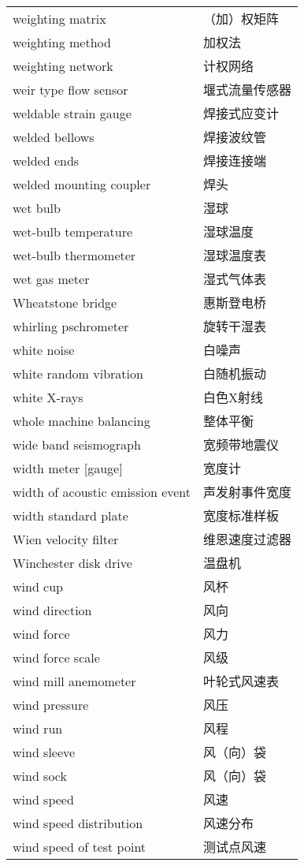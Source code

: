 \documentclass[
]{article}
\begin{document}
\begin{longtable}[]{@{}ll@{}}
weighting matrix & （加）权矩阵 \\
weighting method & 加权法 \\
weighting network & 计权网络 \\
weir type flow sensor & 堰式流量传感器 \\
weldable strain gauge & 焊接式应变计 \\
welded bellows & 焊接波纹管 \\
welded ends & 焊接连接端 \\
welded mounting coupler & 焊头 \\
wet bulb & 湿球 \\
wet-bulb temperature & 湿球温度 \\
wet-bulb thermometer & 湿球温度表 \\
wet gas meter & 湿式气体表 \\
Wheatstone bridge & 惠斯登电桥 \\
whirling pschrometer & 旋转干湿表 \\
white noise & 白噪声 \\
white random vibration & 白随机振动 \\
white X-rays & 白色X射线 \\
whole machine balancing & 整体平衡 \\
wide band seismograph & 宽频带地震仪 \\
width meter {[}gauge{]} & 宽度计 \\
width of acoustic emission event & 声发射事件宽度 \\
width standard plate & 宽度标准样板 \\
Wien velocity filter & 维恩速度过滤器 \\
Winchester disk drive & 温盘机 \\
wind cup & 风杯 \\
wind direction & 风向 \\
wind force & 风力 \\
wind force scale & 风级 \\
wind mill anemometer & 叶轮式风速表 \\
wind pressure & 风压 \\
wind run & 风程 \\
wind sleeve & 风（向）袋 \\
wind sock & 风（向）袋 \\
wind speed & 风速 \\
wind speed distribution & 风速分布 \\
wind speed of test point & 测试点风速 \\

\end{longtable}
\end{document}
